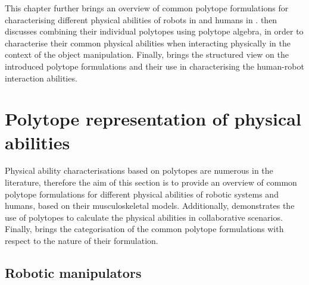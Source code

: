 This chapter further brings an overview of common polytope formulations for characterising different physical abilities of robots in  and humans in .  then discusses combining their individual polytopes using polytope algebra, in order to characterise their common physical abilities when interacting physically in the context of the object manipulation. Finally,  brings the structured view on the introduced polytope formulations and their use in characterising the human-robot interaction abilities.


\section{Polytope representation of physical abilities}
\label{ch:poly_metrics}
Physical ability characterisations based on polytopes are numerous in the literature, therefore the aim of this section is to provide an overview of common polytope formulations for different physical abilities of robotic systems and humans, based on their musculoskeletal models. Additionally,  demonstrates the use of polytopes to calculate the physical abilities in collaborative scenarios. Finally,  brings the categorisation of the common polytope formulations with respect to the nature of their formulation.

\subsection{Robotic manipulators}
\label{ch:robot_metrics}

